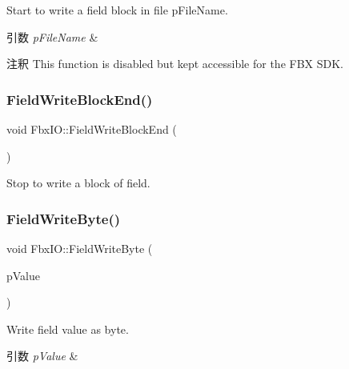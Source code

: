 Start to write a field block in file p\+File\+Name. 
\begin{DoxyParams}{引数}
{\em p\+File\+Name} & \\
\hline
\end{DoxyParams}
\begin{DoxyRemark}{注釈}
This function is disabled but kept accessible for the F\+BX S\+DK. 
\end{DoxyRemark}
\mbox{\label{class_fbx_i_o_a67d6d04f003fc5ebb970f5ef74fe91eb}} 
\subsubsection{\texorpdfstring{Field\+Write\+Block\+End()}{FieldWriteBlockEnd()}}
{\footnotesize\ttfamily void Fbx\+I\+O\+::\+Field\+Write\+Block\+End (\begin{DoxyParamCaption}{ }\end{DoxyParamCaption})}



Stop to write a block of field. 

\mbox{\label{class_fbx_i_o_a73b664f7b0ecb1108062fc5151229d76}} 
\subsubsection{\texorpdfstring{Field\+Write\+Byte()}{FieldWriteByte()}\hspace{0.1cm}{\footnotesize\ttfamily [1/2]}}
{\footnotesize\ttfamily void Fbx\+I\+O\+::\+Field\+Write\+Byte (\begin{DoxyParamCaption}\item[{\hyperlink{fbxtypes_8h_a34067dfe395a7cf3040b7b263c9024d2}{Fbx\+Char}}]{p\+Value }\end{DoxyParamCaption})}

Write field value as byte. 
\begin{DoxyParams}{引数}
{\em p\+Value} & \\
\hline
\end{DoxyParams}
\mbox{\label{class_fbx_i_o_a8a1695ebbccdc5848487c67188c87c39}} 
